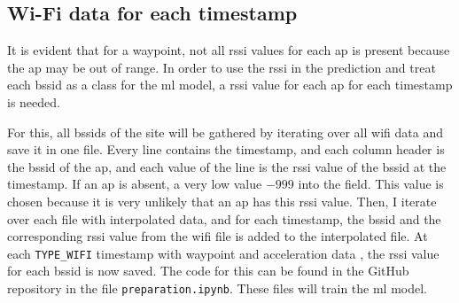 \subsection{Wi-Fi data for each timestamp}\label{sec:wifi-data}
It is evident that for a waypoint, not all \ac{rssi} values for each \ac{ap} is present because the \ac{ap} may be out of range.
In order to use the \ac{rssi} in the prediction and treat each \ac{bssid} as a class for the \ac{ml} model, a \ac{rssi} value for each \ac{ap} for each timestamp is needed.

For this, all \acp{bssid} of the site will be gathered by iterating over all \ac{wifi} data and save it in one file.
Every line contains the timestamp, and each column header is the \ac{bssid} of the \ac{ap}, and each value of the line is the \ac{rssi} value of the \ac{bssid} at the timestamp.
If an \ac{ap} is absent, a very low value \(-999\) into the field.
This value is chosen because it is very unlikely that an \ac{ap} has this \ac{rssi} value. 
Then, I iterate over each file with interpolated data, and for each timestamp, the \ac{bssid} and the corresponding \ac{rssi} value from the \ac{wifi} file is added to the interpolated file.
At each \texttt{TYPE\_WIFI} timestamp with waypoint and acceleration data , the \ac{rssi} value for each \ac{bssid} is now saved.
The code for this can be found in the GitHub repository \cite{github-repo} in the file \texttt{preparation.ipynb}.
These files will train the \ac{ml} model.
